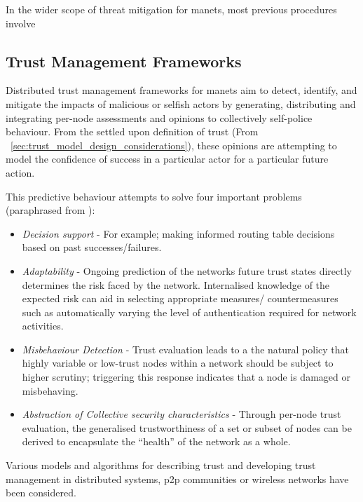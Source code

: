 In the wider scope of threat mitigation for \glspl{manet}, most previous procedures involve 

\subsection{Trust Management Frameworks}\label{sec:tmfs}

Distributed trust management frameworks for \glspl{manet} aim to detect, identify, and mitigate the impacts of malicious or selfish actors by generating, distributing and integrating per-node assessments and opinions to collectively self-police behaviour.
From the settled upon definition of trust (From ~\autoref{sec:trust_model_design_considerations}), these opinions are attempting to model the confidence of success in a particular actor for a particular future action.

This predictive behaviour attempts to solve four important problems (paraphrased from \cite{Sun2008}):
\begin{itemize}
  \item \emph{Decision support} - For example; making informed routing table decisions based on past successes/failures.
  \item \emph{Adaptability} - Ongoing prediction of the networks future trust states directly determines the risk faced by the network. Internalised knowledge of the expected risk can aid in selecting appropriate measures/ countermeasures such as automatically varying the level of authentication required for network activities.
  \item \emph{Misbehaviour Detection} - Trust evaluation leads to a the natural policy that highly variable or low-trust nodes within a network should be subject to higher scrutiny; triggering this response indicates that a node is damaged or misbehaving.
  \item \emph{Abstraction of Collective security characteristics} - Through per-node trust evaluation, the generalised trustworthiness of a set or subset of nodes can be derived to encapsulate the ``health'' of the network as a whole.
\end{itemize}


Various models and algorithms for describing trust and developing trust management in distributed systems, \gls{p2p} communities or wireless networks have been considered.

